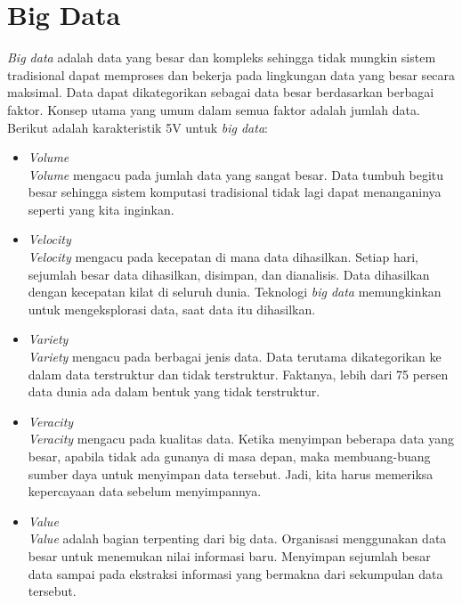 \newpage
\section{Big Data}
\textit{Big data} adalah data yang besar dan kompleks sehingga tidak mungkin sistem tradisional dapat memproses dan bekerja pada lingkungan data yang besar secara maksimal. Data dapat dikategorikan sebagai data besar berdasarkan berbagai faktor. Konsep utama yang umum dalam semua faktor  adalah jumlah data. Berikut adalah karakteristik 5V untuk \textit{big data}:

\begin{itemize}
\item \textit{Volume}\\
\textit{Volume} mengacu pada jumlah data yang sangat besar. Data tumbuh begitu besar sehingga sistem komputasi tradisional tidak lagi dapat menanganinya seperti yang kita inginkan.

\item \textit{Velocity}\\
\textit{Velocity} mengacu pada kecepatan di mana data dihasilkan. Setiap hari, sejumlah besar data dihasilkan, disimpan, dan dianalisis. Data dihasilkan dengan kecepatan kilat di seluruh dunia. Teknologi \textit{big data} memungkinkan untuk mengeksplorasi data, saat data itu dihasilkan.

\item \textit{Variety}\\
\textit{Variety} mengacu pada berbagai jenis data. Data terutama dikategorikan ke dalam data terstruktur dan tidak terstruktur. Faktanya, lebih dari 75 persen data dunia ada dalam bentuk yang tidak terstruktur. 

\item \textit{Veracity}\\
\textit{Veracity} mengacu pada kualitas data. Ketika menyimpan beberapa data yang besar, apabila tidak ada gunanya di masa depan, maka membuang-buang sumber daya untuk menyimpan data tersebut. Jadi, kita harus memeriksa kepercayaan data sebelum menyimpannya. 

\item \textit{Value}\\
\textit{Value} adalah bagian terpenting dari big data. Organisasi menggunakan data besar untuk menemukan nilai informasi baru. Menyimpan sejumlah besar data sampai pada ekstraksi informasi yang bermakna dari sekumpulan data tersebut.
\end{itemize}

